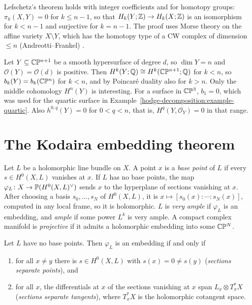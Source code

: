 \begin{remark}\label{kodaira:remark-lefschetz-integral}
Lefschetz's theorem holds with integer coefficients and for homotopy groups: $\pi_k(X, Y) = 0$ for $k \leq n - 1$, so that
$H_k(Y; \mathbb{Z}) \to H_k(X; \mathbb{Z})$ is an isomorphism for $k < n - 1$ and surjective for $k = n - 1$. The proof uses Morse theory on the affine
variety $X \setminus Y$, which has the homotopy type of a CW complex of dimension $\leq n$ (Andreotti--Frankel) \cite[Section 7]{milnor-morse}.
\end{remark}

\begin{example}\label{kodaira:example-hypersurfaces}
Let $Y \subseteq \mathbb{C}\mathbb{P}^{n+1}$ be a smooth hypersurface of degree $d$, so $\dim Y = n$ and $\mathcal{O}(Y) = \mathcal{O}(d)$ is positive. Then
$H^k(Y; \mathbb{Q}) \cong H^k(\mathbb{C}\mathbb{P}^{n+1}; \mathbb{Q})$ for $k < n$, so $b_k(Y) = b_k(\mathbb{C}\mathbb{P}^n)$ for $k < n$, and by Poincar\'e duality also for $k > n$.
Only the middle cohomology $H^n(Y)$ is interesting. For a surface in $\mathbb{C}\mathbb{P}^3$, $b_1 = 0$,
which was used for the quartic surface in Example~\ref{hodge-decomposition:example-quartic}. Also $h^{0,q}(Y) = 0$ for $0 < q < n$, that is,
$H^q(Y, \mathcal{O}_Y) = 0$ in that range.
\end{example}

\section{The Kodaira embedding theorem}\label{kodaira:section-embedding}

\begin{definition}\label{kodaira:definition-very-ample}
Let $L$ be a holomorphic line bundle on $X$. A point $x$ is a \emph{base point} of $L$ if every $s \in H^0(X, L)$ vanishes at $x$. If $L$ has no
base points, the map $\varphi_L \colon X \to \mathbb{P}(H^0(X, L)^\vee)$ sends $x$ to the hyperplane of sections vanishing at $x$. After choosing a
basis $s_0, \ldots, s_N$ of $H^0(X, L)$, it is $x \mapsto [s_0(x) : \cdots : s_N(x)]$, computed in any local frame, so it is holomorphic. $L$ is
\emph{very ample} if $\varphi_L$ is an embedding, and \emph{ample} if some power $L^k$ is very ample. A compact complex manifold is
\emph{projective} if it admits a holomorphic embedding into some $\mathbb{C}\mathbb{P}^N$.
\end{definition}

\begin{lemma}\label{kodaira:lemma-embedding-criterion}
Let $L$ have no base points. Then $\varphi_L$ is an embedding if and only if
\begin{enumerate}
\item for all $x \neq y$ there is $s \in H^0(X, L)$ with $s(x) = 0 \neq s(y)$ (\emph{sections separate points}), and
\item for all $x$, the differentials at $x$ of the sections vanishing at $x$ span $L_x \otimes T^{*}_xX$ (\emph{sections separate tangents}),
where $T^*_xX$ is the holomorphic cotangent space.
\end{enumerate}
\end{lemma}

